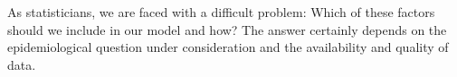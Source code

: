 As statisticians, we are faced with a difficult problem: Which of these factors should we include in our model and how? The answer certainly depends on the epidemiological question under consideration and the availability and quality of data. 





